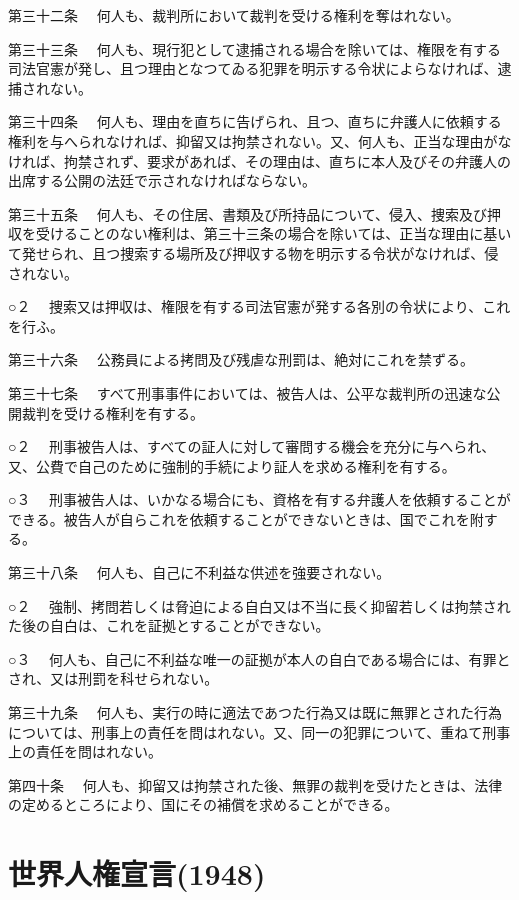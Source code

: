 第三十二条 　何人も、裁判所において裁判を受ける権利を奪はれない。

第三十三条 　何人も、現行犯として逮捕される場合を除いては、権限を有する司法官憲が発し、且つ理由となつてゐる犯罪を明示する令状によらなければ、逮捕されない。

第三十四条 　何人も、理由を直ちに告げられ、且つ、直ちに弁護人に依頼する権利を与へられなければ、抑留又は拘禁されない。又、何人も、正当な理由がなければ、拘禁されず、要求があれば、その理由は、直ちに本人及びその弁護人の出席する公開の法廷で示されなければならない。

第三十五条 　何人も、その住居、書類及び所持品について、侵入、捜索及び押収を受けることのない権利は、第三十三条の場合を除いては、正当な理由に基いて発せられ、且つ捜索する場所及び押収する物を明示する令状がなければ、侵されない。

○２ 　捜索又は押収は、権限を有する司法官憲が発する各別の令状により、これを行ふ。

第三十六条 　公務員による拷問及び残虐な刑罰は、絶対にこれを禁ずる。

第三十七条 　すべて刑事事件においては、被告人は、公平な裁判所の迅速な公開裁判を受ける権利を有する。

○２ 　刑事被告人は、すべての証人に対して審問する機会を充分に与へられ、又、公費で自己のために強制的手続により証人を求める権利を有する。

○３ 　刑事被告人は、いかなる場合にも、資格を有する弁護人を依頼することができる。被告人が自らこれを依頼することができないときは、国でこれを附する。

第三十八条 　何人も、自己に不利益な供述を強要されない。

○２ 　強制、拷問若しくは脅迫による自白又は不当に長く抑留若しくは拘禁された後の自白は、これを証拠とすることができない。

○３ 　何人も、自己に不利益な唯一の証拠が本人の自白である場合には、有罪とされ、又は刑罰を科せられない。

第三十九条 　何人も、実行の時に適法であつた行為又は既に無罪とされた行為については、刑事上の責任を問はれない。又、同一の犯罪について、重ねて刑事上の責任を問はれない。

第四十条 　何人も、抑留又は拘禁された後、無罪の裁判を受けたときは、法律の定めるところにより、国にその補償を求めることができる。


\newpage{}

\section{世界人権宣言(1948)}



